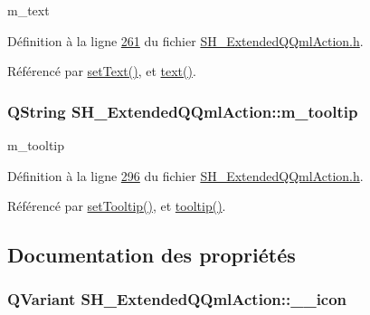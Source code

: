 m\-\_\-text 



Définition à la ligne \hyperlink{SH__ExtendedQQmlAction_8h_source_l00261}{261} du fichier \hyperlink{SH__ExtendedQQmlAction_8h_source}{S\-H\-\_\-\-Extended\-Q\-Qml\-Action.\-h}.



Référencé par \hyperlink{classSH__ExtendedQQmlAction_a2071b7b2ea7583a21553b28b4be814ef}{set\-Text()}, et \hyperlink{classSH__ExtendedQQmlAction_a827915b0ce23a1af60d9aaaf7d052447}{text()}.

\hypertarget{classSH__ExtendedQQmlAction_af04bb6a8446dcd4701a98fc667be693f}{
\subsubsection[{m\-\_\-tooltip}]{\setlength{\rightskip}{0pt plus 5cm}Q\-String S\-H\-\_\-\-Extended\-Q\-Qml\-Action\-::m\-\_\-tooltip\hspace{0.3cm}{\ttfamily [private]}}}\label{classSH__ExtendedQQmlAction_af04bb6a8446dcd4701a98fc667be693f}


m\-\_\-tooltip 



Définition à la ligne \hyperlink{SH__ExtendedQQmlAction_8h_source_l00296}{296} du fichier \hyperlink{SH__ExtendedQQmlAction_8h_source}{S\-H\-\_\-\-Extended\-Q\-Qml\-Action.\-h}.



Référencé par \hyperlink{classSH__ExtendedQQmlAction_a8c90255e9b7a957e82de4cae2226d3f8}{set\-Tooltip()}, et \hyperlink{classSH__ExtendedQQmlAction_ac703f5c565bd0c7a0892627885042f0c}{tooltip()}.



\subsection{Documentation des propriétés}
\hypertarget{classSH__ExtendedQQmlAction_ad8ec5e4334cc550e7358eb3dcf1596f0}{
\subsubsection[{\-\_\-\-\_\-icon}]{\setlength{\rightskip}{0pt plus 5cm}Q\-Variant S\-H\-\_\-\-Extended\-Q\-Qml\-Action\-::\-\_\-\-\_\-icon\hspace{0.3cm}{\ttfamily [read]}}}\label{classSH__ExtendedQQmlAction_ad8ec5e4334cc550e7358eb3dcf1596f0}


